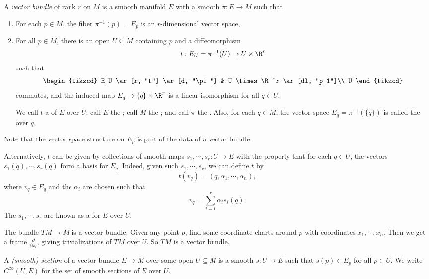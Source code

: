 \documentclass[a4paper]{article}
\begin{document}
\begin{defi}
  A \emph{vector bundle} of rank $r$ on $M$ is a smooth manifold $E$ with a smooth $\pi: E \to M$ such that
  \begin{enumerate}
    \item For each $p \in M$, the fiber $\pi^{-1}(p) = E_p$ is an $r$-dimensional vector space,
    \item For all $p \in M$, there is an open $U \subseteq M$ containing $p$ and a diffeomorphism
      \[
        t: E_U = \pi^{-1}(U) \to U \times \R^r
      \]
      such that
      \[
        \begin{tikzcd}
          E_U \ar[r, "t"] \ar[d, "\pi"] & U \times \R^r \ar[dl, "p_1"]\\
          U
        \end{tikzcd}
      \]
      commutes, and the induced map $E_q \to \{q\} \times \R^r$ is a linear isomorphism for all $q \in U$.

      We call $t$ a  of $E$ over $U$; call $E$ the ; call $M$ the ; and call $\pi$ the . Also, for each $q \in M$, the vector space $E_q = \pi^{-1}(\{q\})$ is called the  over $q$.
  \end{enumerate}
  Note that the vector space structure on $E_p$ is part of the data of a vector bundle.
\end{defi}

Alternatively, $t$ can be given by collections of smooth maps $s_1, \cdots, s_r: U \to E$ with the property that for each $q \in U$, the vectors $s_1(q), \cdots, s_r(q)$ form a basis for $E_q$. Indeed, given such $s_1, \cdots, s_r$, we can define $t$ by
\[
  t(v_q) = (q, \alpha_1, \cdots, \alpha_n),
\]
where $v_q \in E_q$ and the $\alpha_i$ are chosen such that
\[
  v_q = \sum_{i = 1}^r \alpha_i s_i(q).
\]
The $s_1, \cdots, s_r$ are known as a  for $E$ over $U$.

\begin{eg}
  The bundle $TM \to M$ is a vector bundle. Given any point $p$, find some coordinate charts around $p$ with coordinates $x_1, \cdots, x_n$. Then we get a frame $\frac{\partial}{\partial x_i}$, giving trivializations of $TM$ over $U$. So $TM$ is a vector bundle.
\end{eg}

\begin{defi}[Section]
  A \emph{(smooth) section} of a vector bundle $E \to M$ over some open $U \subseteq M$ is a smooth $s: U \to E$ such that $s(p) \in E_p$ for all $p \in U$. We write $C^\infty(U, E)$ for the set of smooth sections of $E$ over $U$.
\end{defi}
\end{document}
